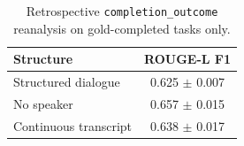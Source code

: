 \begin{table}[t]
\centering
\small
\begin{tabular}{lc}
\toprule
Structure & ROUGE-L F1 \\
\midrule
Structured dialogue & 0.625 $\pm$ 0.007 \\
No speaker & 0.657 $\pm$ 0.015 \\
Continuous transcript & 0.638 $\pm$ 0.017 \\
\bottomrule
\end{tabular}
\caption{Retrospective \texttt{completion\_outcome} reanalysis on gold-completed tasks only.}
\label{tab:completion-outcome-reanalysis}
\end{table}
